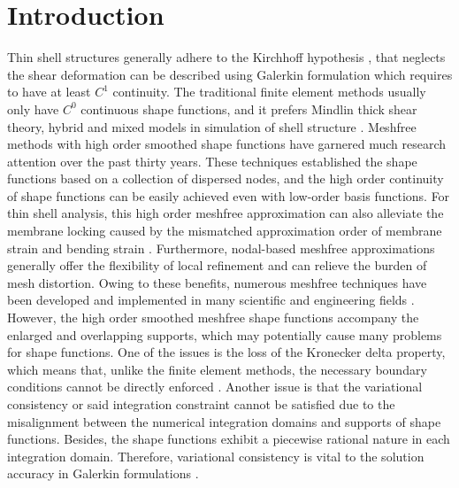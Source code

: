 \section{Introduction}\label{introduction}
Thin shell structures generally adhere to the Kirchhoff hypothesis \cite{donnell1976}, that neglects the shear deformation can be described using Galerkin formulation which requires to have at least $C^1$ continuity. The traditional finite element methods usually only have $C^0$ continuous shape functions, and it prefers Mindlin thick shear theory, hybrid and mixed models in simulation of shell structure  \cite{hughes2000}. Meshfree methods \cite{belytschko1994,liu1995,chen2017} with high order smoothed shape functions have garnered much research attention over the past thirty years. These techniques established the shape functions based on a collection of dispersed nodes, and the high order continuity of shape functions can be easily achieved even with low-order basis functions. For thin shell analysis, this high order meshfree approximation can also alleviate the membrane locking caused by the mismatched approximation order of membrane strain and bending strain \cite{krysl1996}. Furthermore, nodal-based meshfree approximations generally offer the flexibility of local refinement and can relieve the burden of mesh distortion. Owing to these benefits, numerous meshfree techniques have been developed and implemented in many scientific and engineering fields \cite{liu2009,zhang2000meshless,millan2011,wang2023b,suchde2023,deng2023b}. However, the high order smoothed meshfree shape functions accompany the enlarged and overlapping supports, which may potentially cause many problems for shape functions. One of the issues is the loss of the Kronecker delta property, which means that, unlike the finite element methods, the necessary boundary conditions cannot be directly enforced  \cite{fernandez-mendez2004}. Another issue is that the variational consistency or said integration constraint cannot be satisfied due to the misalignment between the numerical integration domains and supports of shape functions. Besides, the shape functions exhibit a piecewise rational nature in each integration domain. Therefore, variational consistency is vital to the solution accuracy in Galerkin formulations \cite{li2016, wu2021}.

